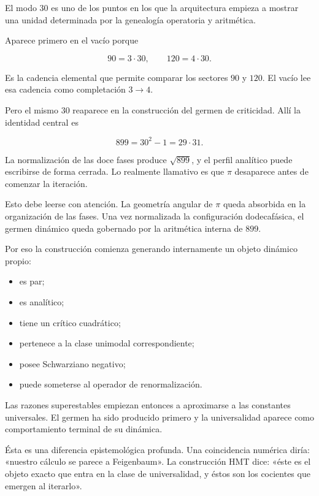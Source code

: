 El modo \(30\) es uno de los puntos en los que la arquitectura empieza a mostrar una unidad determinada por la genealogía operatoria y aritmética.\par

Aparece primero en el vacío porque\par

\[
90=3\cdot30,
\qquad
120=4\cdot30.
\]

Es la cadencia elemental que permite comparar los sectores \(90\) y \(120\). El vacío lee esa cadencia como completación \(3\to4\).\par

Pero el mismo \(30\) reaparece en la construcción del germen de criticidad. Allí la identidad central es\par

\[
899=30^2-1=29\cdot31.
\]

La normalización de las doce fases produce \(\sqrt{899}\), y el perfil analítico puede escribirse de forma cerrada. Lo realmente llamativo es que \(\pi\) desaparece antes de comenzar la iteración.\par

Esto debe leerse con atención. La geometría angular de \(\pi\) queda absorbida en la organización de las fases. Una vez normalizada la configuración dodecafásica, el germen dinámico queda gobernado por la aritmética interna de \(899\).\par

Por eso la construcción comienza generando internamente un objeto dinámico propio:\par

\begin{itemize}[leftmargin=*,itemsep=0.35em]
\item es par;
\item es analítico;
\item tiene un crítico cuadrático;
\item pertenece a la clase unimodal correspondiente;
\item posee Schwarziano negativo;
\item puede someterse al operador de renormalización.
\end{itemize}

Las razones superestables empiezan entonces a aproximarse a las constantes universales. El germen ha sido producido primero y la universalidad aparece como comportamiento terminal de su dinámica.\par

Ésta es una diferencia epistemológica profunda. Una coincidencia numérica diría: «nuestro cálculo se parece a Feigenbaum». La construcción HMT dice: «éste es el objeto exacto que entra en la clase de universalidad, y éstos son los cocientes que emergen al iterarlo».\par

